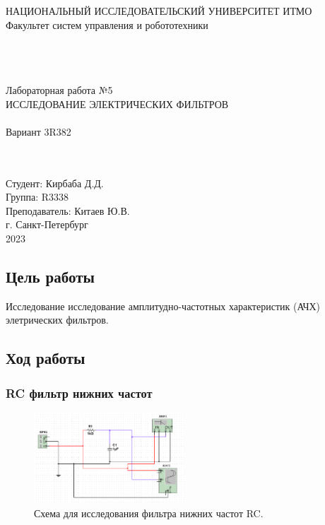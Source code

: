 \documentclass[12pt]{article}
\begin{document}
\begin{titlepage}
\begin{center}
    НАЦИОНАЛЬНЫЙ ИССЛЕДОВАТЕЛЬСКИЙ УНИВЕРСИТЕТ ИТМО \\
    Факультет систем управления и робототехники \\
    \vspace*{10\baselineskip}
    {} \\
    \ \\
    \ \\
    \begin{spacing}{1.5}
    {\large Лабораторная работа №5 \\
    ИССЛЕДОВАНИЕ ЭЛЕКТРИЧЕСКИХ ФИЛЬТРОВ \\
    \ \\
    Вариант 3R382}
    \end{spacing} \\
    \ \\
    \vspace*{10\baselineskip}
    \hfill {Студент: Кирбаба Д.Д.\ \ \ \ \ \ \ \ \ } \\
    \hfill {Группа: R3338\ \ \ \ \ \ \ \ \ \ \ \ \ \ \ \ \ \ \ \ \ } \\
    \hfill {Преподаватель: Китаев Ю.В.} \\
    \mbox{}
    \vfill {г. Санкт-Петербург\\2023}
\end{center}
\end{titlepage}

\subsection*{Цель работы}
Исследование исследование амплитудно-частотных характеристик (АЧХ) элетрических фильтров.

\subsection*{Ход работы}

\subsubsection*{RC фильтр нижних частот}
\begin{figure}[H]
    \centering
    \includegraphics[width=0.5\textwidth]{1_scheme.png}
    \caption{Схема для исследования фильтра нижних частот RC.}
    \label{fig:1_scheme}
\end{figure}
\end{document}
